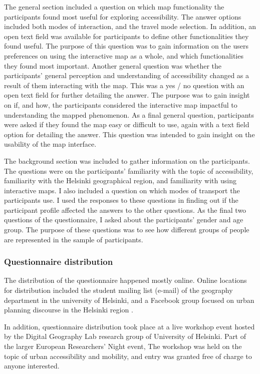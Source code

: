 The general section included a question on
which map functionality the participants found most useful for exploring accessibility.
The answer options included both modes of interaction, and the travel mode selection.
In addition, an open text field was available for participants to define
other functionalities they found useful.
The purpose of this question was to gain information on the users preferences on using
the interactive map as a whole, and which functionalities they found most important.
Another general question was whether
the participants' general perception and understanding of accessibility
changed as a result of them interacting with the map.
This was a yes / no question with an open text field for further detailing the answer.
The purpose was to gain insight on if, and how, the participants considered the
interactive map impactful to understanding the mapped phenomenon.
As a final general question, participants were asked if they found the map
easy or difficult to use, again with a text field option for detailing the answer.
This question was intended to gain insight on the usability of the map interface.

The background section was included to gather information on the participants.
The questions were on the participants' familiarity with the topic of accessibility,
familiarity with the Helsinki geographical region, and familiarity with using interactive maps.
I also included a question on which modes of transport the participants use.
I used the responses to these questions in finding out if the participant profile
affected the answers to the other questions.
As the final two questions of the questionnaire,
I asked about the participants' gender and age group.
The purpose of these questions was to see how
different groups of people are represented in the sample of participants.


\subsubsection{Questionnaire distribution}

The distribution of the questionnaire happened mostly online.
Online locations for distribution included the student mailing list (e-mail)
of the geography department in the university of Helsinki,
and a Facebook group focused on urban planning discourse in the Helsinki region
\parencite{lisaakaupunkiahki}.

In addition, questionnaire distribution took place at a live workshop event hosted by the
Digital Geography Lab research group of University of Helsinki.
Part of the larger European Researchers' Night event,
The workshop was held on the topic of urban accessibility and mobility,
and entry was granted free of charge to anyone interested.

